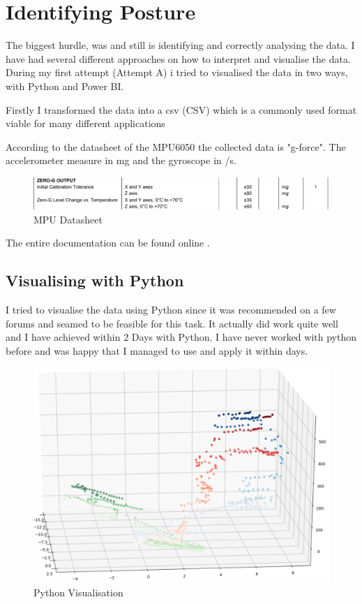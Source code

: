 \section{Identifying Posture}

The biggest hurdle, was and still is identifying and correctly analysing the data. I have had several different approaches on how to interpret and visualise the data. During my first attempt (Attempt A) i tried to visualised the data in two ways, with Python and Power BI.

Firstly I transformed the data into a \acrshort{csv} (\gls{CSV}) which is a commonly used format viable for many different applications

According to the datasheet of the MPU6050 the collected data is "g-force". The accelerometer measure in mg and the gyroscope in \degree/s. 

\begin{figure}[h]
\begin{center}
\includegraphics[width=\linewidth]{images/MPU6050_DATA.png}
  \end{center}
  \caption{MPU Datasheet}
  \label{fig:MPUDatasheet}
\end{figure}

The entire documentation can be found online \cite{MPU6000D59:online}.

\subsection{Visualising with Python}

I tried to visualise the data using \gls{Python} since it was recommended on a few forums and seamed to be feasible for this task. It actually did work quite well and I have achieved within 2 Days with Python. I have never worked with python before and was happy that I managed to use and apply it within days. 

\begin{figure}[h!]
\begin{center}
\includegraphics[width=0.6\linewidth]{images/PyVisualisation.png}
  \end{center}
  \caption{Python Visualisation}
  \label{fig:PythonVisualisation}
\end{figure}

